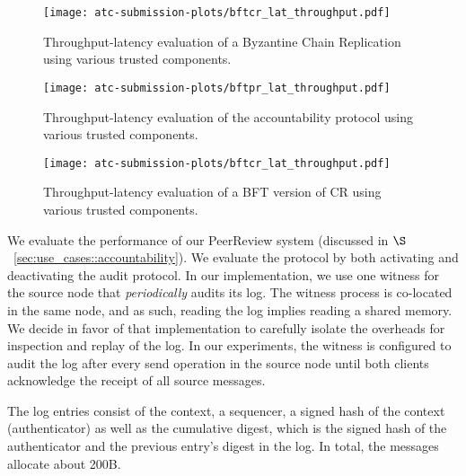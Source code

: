 \begin{figure*}[t!]
\begin{center}
  \centering
  \texttt{[image: atc-submission-plots/bftcr\_lat\_throughput.pdf]} 
    \caption{Throughput-latency evaluation of a Byzantine Chain Replication using various trusted components.} \label{fig:byz_chain_replication}
\endminipage
{}
  \centering
  \texttt{[image: atc-submission-plots/bftpr\_lat\_throughput.pdf]} 
    \caption{Throughput-latency evaluation of the accountability protocol using various trusted components.} \label{fig:accountability_protocol}
\endminipage
\end{center}
\end{figure*}
\fi


\begin{figure}[t!]
    \centering
    \texttt{[image: atc-submission-plots/bftcr\_lat\_throughput.pdf]} 
    \caption{Throughput-latency evaluation of a BFT version of CR using various trusted components.} \label{fig:lat_throughput_kernel}
\end{figure}
\fi






 We evaluate the performance of our PeerReview system (discussed in $\S$~\ref{sec:use_cases::accountability}). %
We evaluate the protocol by both activating and deactivating the audit protocol. In our implementation, we use one witness for the source node that {\em periodically} audits its log. The witness process is co-located in the same node, and as such, reading the log implies reading a shared memory. We decide in favor of that implementation to carefully isolate the overheads for inspection and replay of the log. In our experiments, the witness is configured to audit the log after every send operation in the source node until both clients acknowledge the receipt of all source messages.

The log entries consist of the context, a sequencer, a signed hash of the context (authenticator) as well as the cumulative digest, which is the signed hash of the authenticator and the previous entry's digest in the log. In total, the messages allocate about 200B.%

